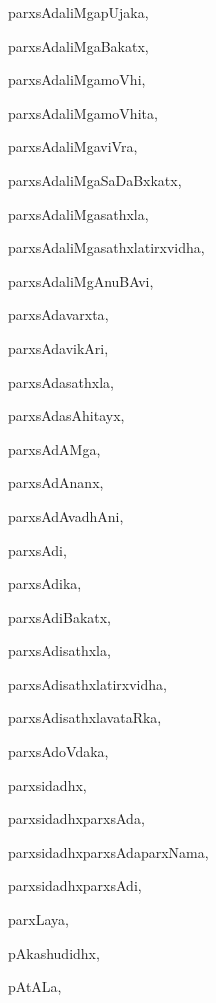 \begin{multicols}{2}
{parxsAdaliMgapUjaka}, \pageref{parxsAdaliMgapUjaka}

{parxsAdaliMgaBakatx}, \pageref{parxsAdaliMgaBakatx}

{parxsAdaliMgamoVhi}, \pageref{parxsAdaliMgamoVhi}

{parxsAdaliMgamoVhita}, \pageref{parxsAdaliMgamoVhita}

{parxsAdaliMgaviVra}, \pageref{parxsAdaliMgaviVra}

{parxsAdaliMgaSaDaBxkatx}, \pageref{parxsAdaliMgaSaDaBxkatx}

{parxsAdaliMgasathxla}, \pageref{parxsAdaliMgasathxla}

{parxsAdaliMgasathxlatirxvidha}, \pageref{parxsAdaliMgasathxlatirxvidha}

{parxsAdaliMgAnuBAvi}, \pageref{parxsAdaliMgAnuBAvi}

{parxsAdavarxta}, \pageref{parxsAdavarxta}

{parxsAdavikAri}, \pageref{parxsAdavikAri2}

{parxsAdasathxla}, \pageref{parxsAdasathxla}

{parxsAdasAhitayx}, \pageref{parxsAdasAhitayx}

{parxsAdAMga}, \pageref{parxsAdAMga}

{parxsAdAnanx}, \pageref{parxsAdAnanx}

{parxsAdAvadhAni}, \pageref{parxsAdAvadhAni}

{parxsAdi}, \pageref{parxsAdi}

{parxsAdika}, \pageref{parxsAdika}

{parxsAdiBakatx}, \pageref{parxsAdiBakatx}

{parxsAdisathxla}, \pageref{parxsAdisathxla}

{parxsAdisathxlatirxvidha}, \pageref{parxsAdisathxlatirxvidha}

{parxsAdisathxlavataRka}, \pageref{parxsAdisathxlavataRka}

{parxsAdoVdaka}, \pageref{parxsAdoVdaka}

{parxsidadhx}, \pageref{parxsidadhx}

{parxsidadhxparxsAda}, \pageref{parxsidadhxparxsAda}

{parxsidadhxparxsAdaparxNama}, \pageref{parxsidadhxparxsAdaparxNama}

{parxsidadhxparxsAdi}, \pageref{parxsidadhxparxsAdi}

{parxLaya}, \pageref{parxLaya}

{pAkashudidhx}, \pageref{pAkashudidhx}

{pAtALa}, \pageref{pAtALa}


\end{multicols}
